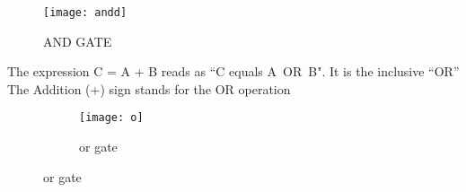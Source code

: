 \documentclass{article}
\begin{document}
\begin{figure}
	\centering
	\texttt{[image: andd]}
	\caption{AND GATE}
\end{figure}

The expression C = A + B reads as “C equals A OR B". It is the inclusive “OR”
The Addition (+) sign stands for the OR operation

\begin{figure}[h!]
	\centering
	\begin{subfigure}[b]{0.2\linewidth}
		
		\texttt{[image: o]}
		\caption{or gate}\end{subfigure}
	\end{figure}


	
\end{document}
